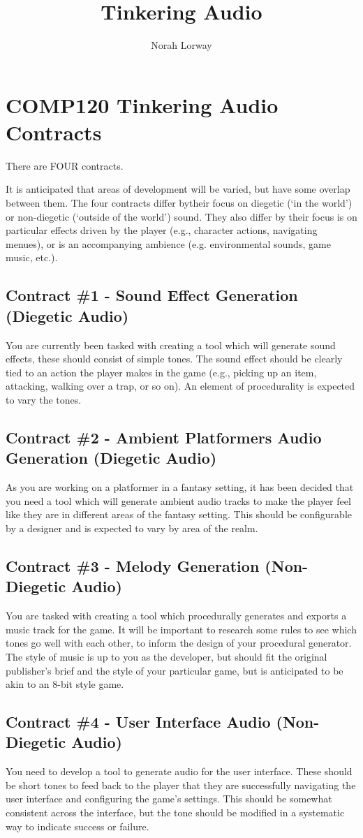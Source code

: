 \documentclass{../../fal_assignment}
\title{Tinkering Audio}
\author{Norah Lorway}
\begin{document}
\section*{COMP120 Tinkering Audio Contracts}

There are FOUR contracts.

It is anticipated that areas of development will be varied, but have some overlap between them. The four contracts differ bytheir focus on diegetic (`in the world') or non-diegetic (`outside of the world') sound. They also differ by their focus is on particular effects driven by the player (e.g., character actions, navigating menues), or is an accompanying ambience (e.g. environmental sounds, game music, etc.).

\subsection*{Contract \#1 - Sound Effect Generation (Diegetic Audio)}
You are currently been tasked with creating a tool which will generate sound effects, these should consist of simple tones. The sound effect should be clearly tied to an action the player makes in the game (e.g., picking up an item, attacking, walking over a trap, or so on). An element of procedurality is expected to vary the tones.

\subsection*{Contract \#2 - Ambient Platformers Audio Generation (Diegetic Audio)}
As you are working on a platformer in a fantasy setting, it has been decided that you need a tool which will generate ambient audio tracks to make the player feel like they are in different areas of the fantasy setting. This should be configurable by a designer and is expected to vary by area of the realm.

\subsection*{Contract \#3 - Melody Generation (Non-Diegetic Audio)}
You are tasked with creating a tool which procedurally generates and exports a music track for the game. It will be important to research some rules to see which tones go well with each other, to inform the design of your procedural generator. The style of music is up to you as the developer, but should fit the original publisher's brief and the style of your particular game, but is anticipated to be akin to an 8-bit style game.

\subsection*{Contract \#4 - User Interface Audio (Non-Diegetic Audio)}
You need to develop a tool to generate audio for the user interface. These should be short tones to feed back to the player that they are successfully navigating the user interface and configuring the game's settings. This should be somewhat consistent across the interface, but the tone should be modified in a systematic way to indicate success or failure.
\end{document}
